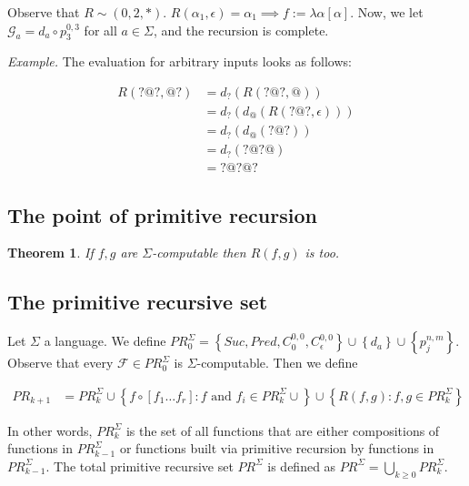 \documentclass[a4paper, 12pt]{article}
\newtheorem{theorem}{Theorem}
\newtheorem{theorem}{Theorem}
\begin{document}
Observe that $R \sim (0, 2, *)$. $R(\alpha_1, \epsilon) = \alpha_1 \implies f :=
\lambda \alpha[\alpha]$. Now, we let $\mathcal{G}_{a} = d_a \circ p_{3}^{0, 3}$
for all $a \in \Sigma$, and the recursion is complete.

\textit{Example.} The evaluation for arbitrary inputs looks as follows:

\begin{align*}
    R(?@?, @?) &= d_? \left( R(?@?, @) \right)  \\ 
               &= d_? \left( d_@ \left( R(?@?, \epsilon) \right)  \right)  \\ 
               &= d_? \left(  d_@ \left( ?@? \right)  \right)  \\ 
               &= d_? \left( ?@?@ \right) \\ 
               &= ?@?@?
\end{align*}

\subsection{The point of primitive recursion}

\begin{theorem}
    If $f, g$ are $\Sigma$-computable then $R(f, g)$ is too.
\end{theorem}

\subsection{The primitive recursive set}

Let $\Sigma$ a language. We define $PR_0^{\Sigma} = \left\{ Suc, Pred, C_0^{0,
0}, C_{\epsilon}^{0, 0} \right\} \cup \left\{ d_a \right\} \cup \left\{ p_j^{n,
m} \right\}  $. Observe that every $\mathcal{F} \in PR_0^{\Sigma}$ is
$\Sigma$-computable. Then we define 

\begin{align*}
    PR_{k + 1} &= PR_{k}^{\Sigma} \cup \left\{ f \circ \left[ f_1\ldots f_r
    \right] : f \text{ and } f_i \in PR_{k}^{\Sigma} \cup  \right\} \cup \left\{
R(f, g) : f, g \in PR_{k}^{\Sigma}\right\} 
\end{align*}

In other words, $PR_{k}^{\Sigma}$ is the set of all functions that are either
compositions of functions in $PR_{k-1}^{\Sigma}$ or functions built via
primitive recursion by functions in $PR_{k-1}^{\Sigma}$. The total primitive
recursive set $PR^{\Sigma}$ is defined as $PR^{\Sigma} = \bigcup_{k \geq 0}
PR_{k}^{\Sigma}$.
\end{document}

